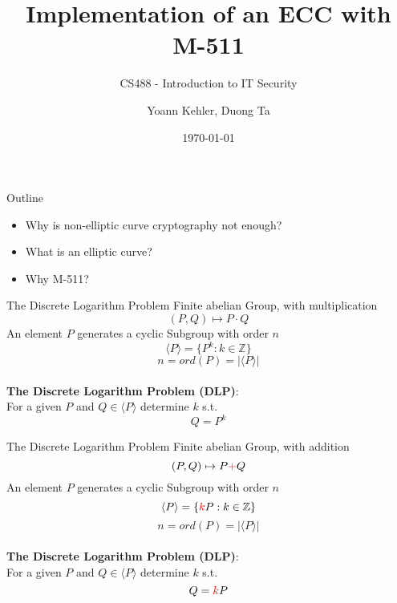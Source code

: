 \documentclass{beamer}
\begin{document}
\title{Implementation of an ECC with M-511} 
\subtitle{CS488 - Introduction to IT Security}
\author{Yoann Kehler, Duong Ta}
\date{\today} 

\begin{frame}
\titlepage
\end{frame} 

\begin{frame}{Outline}
\begin{itemize}
	\item Why is non-elliptic curve cryptography not enough?
	\item What is an elliptic curve?
	\item Why M-511?
\end{itemize}
\end{frame} 
\begin{frame}{The Discrete Logarithm Problem\cite{werner2013elliptische}}
	Finite abelian Group, with multiplication\\
	\[(P,Q) \mapsto P \cdot Q\]
	\pause
	An element $P$ generates a cyclic Subgroup with order $n$\\
	\[\langle P \rangle = \{P^k : k \in \mathbb{Z} \} \]
	\[n = ord(P) = |\langle P \rangle| \]\\ \vspace{0.5cm}
	\pause
	\textbf{The Discrete Logarithm Problem (DLP)}: \\
	For a given $P$ and $Q \in \langle P \rangle$ determine $k$ s.t. \\
	\[Q=P^k\]
\end{frame}
\begin{frame}{The Discrete Logarithm Problem\cite{werner2013elliptische}}
Finite abelian Group, with \textcolor[rgb]{1.00,0.00,0.00}{addition}\\
\[(P,Q) \mapsto P \textcolor[rgb]{1.00,0.00,0.00}{+} Q\]
An element $P$ generates a cyclic Subgroup with order $n$\\
\[\langle P \rangle = \{\textcolor[rgb]{1.00,0.00,0.00}{k}P : k \in \mathbb{Z} \} \]
\[n = ord(P) = |\langle P \rangle| \]\\ \vspace{0.5cm}
\textbf{The Discrete Logarithm Problem (DLP)}: \\
For a given $P$ and $Q \in \langle P \rangle$ determine $k$ s.t. \\
\[Q=\textcolor[rgb]{1.00,0.00,0.00}{k}P\]

\end{frame}
\end{document}
